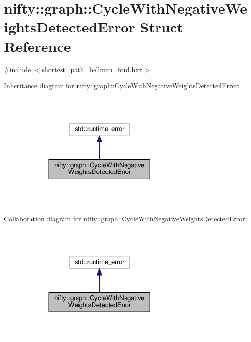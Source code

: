 \hypertarget{structnifty_1_1graph_1_1CycleWithNegativeWeightsDetectedError}{}\section{nifty\+:\+:graph\+:\+:Cycle\+With\+Negative\+Weights\+Detected\+Error Struct Reference}
\label{structnifty_1_1graph_1_1CycleWithNegativeWeightsDetectedError}


{\ttfamily \#include $<$shortest\+\_\+path\+\_\+bellman\+\_\+ford.\+hxx$>$}



Inheritance diagram for nifty\+:\+:graph\+:\+:Cycle\+With\+Negative\+Weights\+Detected\+Error\+:\nopagebreak
\begin{figure}[H]
\begin{center}
\leavevmode
\includegraphics[width=236pt]{structnifty_1_1graph_1_1CycleWithNegativeWeightsDetectedError__inherit__graph}
\end{center}
\end{figure}


Collaboration diagram for nifty\+:\+:graph\+:\+:Cycle\+With\+Negative\+Weights\+Detected\+Error\+:\nopagebreak
\begin{figure}[H]
\begin{center}
\leavevmode
\includegraphics[width=236pt]{structnifty_1_1graph_1_1CycleWithNegativeWeightsDetectedError__coll__graph}
\end{center}
\end{figure}
